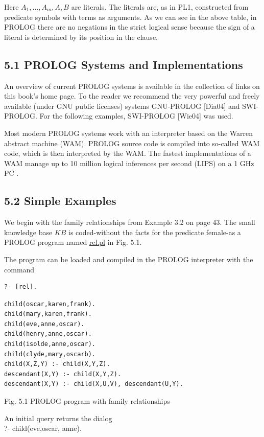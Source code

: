 \documentclass[10pt]{book}
\begin{document}
\begin{center}
Here $A_{1}, \ldots, A_{m}, A, B$ are literals. The literals are, as in PL1, constructed from predicate symbols with terms as arguments. As we can see in the above table, in PROLOG there are no negations in the strict logical sense because the sign of a literal is determined by its position in the clause.

\subsection*{5.1 PROLOG Systems and Implementations}
An overview of current PROLOG systems is available in the collection of links on this book's home page. To the reader we recommend the very powerful and freely available (under GNU public licenses) systems GNU-PROLOG [Dia04] and SWI-PROLOG. For the following examples, SWI-PROLOG [Wie04] was used.

Most modern PROLOG systems work with an interpreter based on the Warren abstract machine (WAM). PROLOG source code is compiled into so-called WAM code, which is then interpreted by the WAM. The fastest implementations of a WAM manage up to 10 million logical inferences per second (LIPS) on a 1 GHz PC .

\subsection*{5.2 Simple Examples}
We begin with the family relationships from Example 3.2 on page 43. The small knowledge base $K B$ is coded-without the facts for the predicate female-as a PROLOG program named \href{http://rel.pl}{rel.pl} in Fig. 5.1.

The program can be loaded and compiled in the PROLOG interpreter with the command

\begin{verbatim}
?- [rel].
\end{verbatim}

\begin{verbatim}
child(oscar,karen,frank).
child(mary,karen,frank).
child(eve,anne,oscar).
child(henry,anne,oscar).
child(isolde,anne,oscar).
child(clyde,mary,oscarb).
child(X,Z,Y) :- child(X,Y,Z).
descendant(X,Y) :- child(X,Y,Z).
descendant(X,Y) :- child(X,U,V), descendant(U,Y).
\end{verbatim}

Fig. 5.1 PROLOG program with family relationships

An initial query returns the dialog\\
?- child(eve,oscar, anne).


\end{center}
\end{document}
